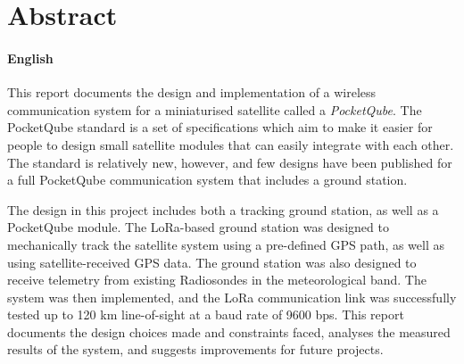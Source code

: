 \chapter*{Abstract}
\makeatletter{}\makeatother

\subsubsection*{English}

This report documents the design and implementation of a wireless communication system for a miniaturised satellite called a \textit{PocketQube}. The PocketQube standard is a set of specifications which aim to make it easier for people to design small satellite modules that can easily integrate with each other. The standard is relatively new, however, and few designs have been published for a full PocketQube communication system that includes a ground station.

The design in this project includes both a tracking ground station, as well as a PocketQube module. The LoRa-based ground station was designed to mechanically track the satellite system using a pre-defined GPS path, as well as using satellite-received GPS data. The ground station was also designed to receive telemetry from existing Radiosondes in the meteorological band. The system was then implemented, and the LoRa communication link was successfully tested up to 120 km line-of-sight at a baud rate of 9600 bps. This report documents the design choices made and constraints faced, analyses the measured results of the system, and suggests improvements for future projects.

